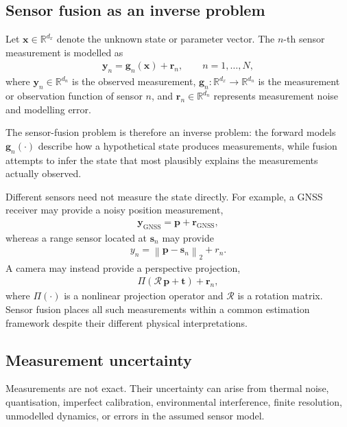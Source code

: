 \subsection{Sensor fusion as an inverse problem}
Let $\mathbf{x}\in\mathbb{R}^{d_x}$ denote the unknown state or parameter vector. The $n$-th sensor measurement is modelled as
\begin{align}
\mathbf{y}_n=\mathbf{g}_n(\mathbf{x})+\mathbf{r}_n, \qquad n=1,\ldots,N,
\end{align}
where $\mathbf{y}_n\in\mathbb{R}^{d_n}$ is the observed measurement, $\mathbf{g}_n:\mathbb{R}^{d_x}\rightarrow\mathbb{R}^{d_n}$ is the measurement or observation function of sensor $n$, and $\mathbf{r}_n\in\mathbb{R}^{d_n}$ represents measurement noise and modelling error.

The sensor-fusion problem is therefore an inverse problem: the forward models $\mathbf{g}_n(\cdot)$ describe how a hypothetical state produces measurements, while fusion attempts to infer the state that most plausibly explains the measurements actually observed. 

Different sensors need not measure the state directly. For example, a GNSS receiver may provide a noisy position measurement,
\begin{align*}
\mathbf{y}_{\mathrm{GNSS}}=\mathbf{p}+\mathbf{r}_{\mathrm{GNSS}},
\end{align*}
whereas a range sensor located at $\mathbf{s}_n$ may provide
\begin{align*}
y_n=\left\|\mathbf{p}-\mathbf{s}_n\right\|_2+r_n.
\end{align*}
A camera may instead provide a perspective projection,
\begin{align*}
\Pi\left(\boldsymbol{\mathcal{R}}\,\mathbf{p}+\mathbf{t}\right) +\mathbf{r}_n,
\end{align*}
where $\Pi(\cdot)$ is a nonlinear projection operator and $\boldsymbol{\mathcal{R}}$ is a rotation matrix. Sensor fusion places all such measurements within a common estimation framework despite their different physical interpretations.

\subsection{Measurement uncertainty}
Measurements are not exact. Their uncertainty can arise from thermal noise, quantisation, imperfect calibration, environmental interference, finite resolution, unmodelled dynamics, or errors in the assumed sensor model.

